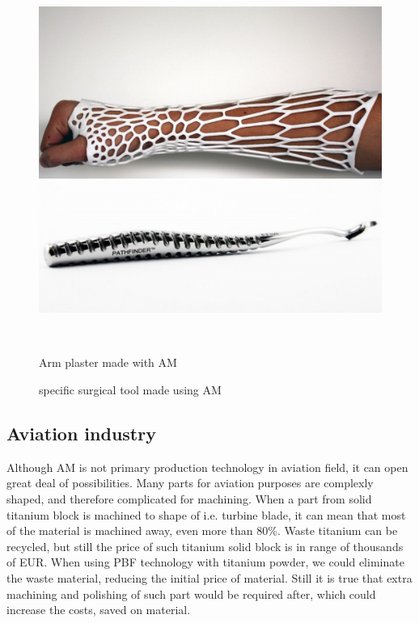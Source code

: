 \documentclass[a4paper, twoside, 11pt]{report}
\begin{document}
\begin{figure}[h]
  \centering
  \begin{minipage}[b]{0.45\textwidth}
    \includegraphics[width=\textwidth]{armPlaster}
  \end{minipage}
  \hfill
  \begin{minipage}[b]{0.45\textwidth}
    \includegraphics[width=\textwidth]{surgicalTool}
  \end{minipage}
  \\[5pt]
  \begin{minipage}[t]{0.45\textwidth}
    \caption{Arm plaster made with AM}
  \end{minipage}
  \hfill
  \begin{minipage}[t]{0.45\textwidth}
    \caption{specific surgical tool made using AM}
  \end{minipage}
\end{figure}
\subsection{Aviation industry}
Although AM is not primary production technology in aviation field, it can open great deal of possibilities. Many parts for aviation purposes are complexly shaped, and therefore complicated for machining. When a part from solid titanium block is machined to shape of i.e. turbine blade, it can mean that most of the material is machined away, even more than 80\%. Waste titanium can be recycled, but still the price of such titanium solid block is in range of thousands of EUR. When using PBF technology with titanium powder, we could eliminate the waste material, reducing the initial price of material. Still it is true that extra machining and polishing of such part would be required after, which could increase the costs, saved on material.
\end{document}
